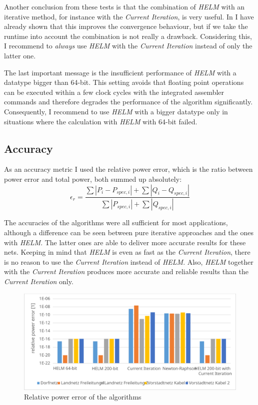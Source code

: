Another conclusion from these tests is that the combination of \emph{HELM} with an iterative method, for instance with the \emph{Current Iteration}, is very useful. In  I have already shown that this improves the convergence behaviour, but if we take the runtime into account the combination is not really a drawback. Considering this, I recommend to \emph{always} use \emph{HELM} with the \emph{Current Iteration} instead of only the latter one.

The last important message is the insufficient performance of \emph{HELM} with a datatype bigger than 64-bit. This setting avoids that floating point operations can be executed within a few clock cycles with the integrated assembler commands and therefore degrades the performance of the algorithm significantly. Consequently, I recommend to use \emph{HELM} with a bigger datatype only in situations where the calculation with \emph{HELM} with 64-bit failed.

\subsection{Accuracy}

As an accuracy metric I used the relative power error, which is the ratio between power error and total power, both summed up absolutely:
\begin{equation}
	\epsilon_r = \frac{\sum |P_i - P_{spec,i}| + \sum |Q_i - Q_{spec,i}|}{\sum |P_{spec,i}| + \sum |Q_{spec,i}|}
\end{equation}

The accuracies of the algorithms  were all sufficient for most applications, although a difference can be seen between pure iterative approaches and the ones with \emph{HELM}. The latter ones are able to deliver more accurate results for these nets. Keeping in mind that \emph{HELM} is even as fast as the \emph{Current Iteration}, there is no reason to use the \emph{Current Iteration} instead of \emph{HELM}. Also, \emph{HELM} together with the \emph{Current Iteration} produces more accurate and reliable results than the \emph{Current Iteration} only.

\begin{figure}
	\centering
	\includegraphics[scale=0.7]{figures/comparison_accuracy}
	\caption[Comparison, accuracy]{Relative power error of the algorithms}
	\label{fig:comparison_accuracy}
\end{figure}

